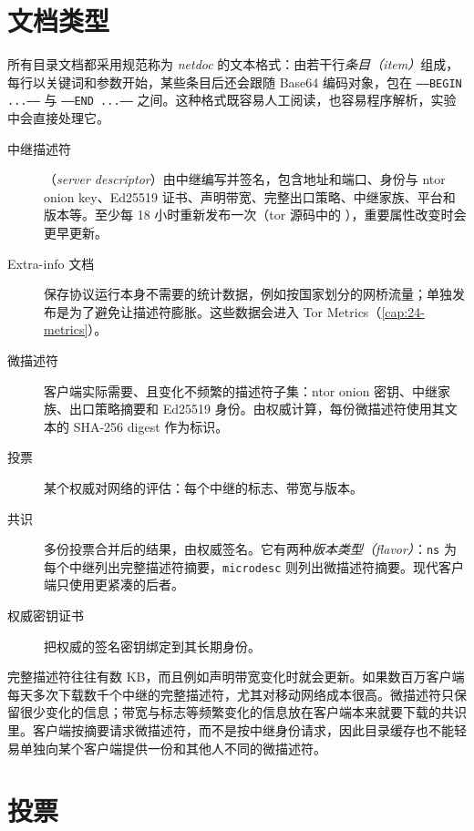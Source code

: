 \section{文档类型}\label{sec:dir-documenti}

所有目录文档都采用规范称为 \emph{netdoc} 的文本格式：由若干行\emph{条目（item）}组成，每行以关键词和参数开始，某些条目后还会跟随 Base64 编码对象，包在 \texttt{-----BEGIN ...-----} 与 \texttt{-----END ...-----} 之间。这种格式既容易人工阅读，也容易程序解析，实验中会直接处理它。

\begin{description}
  \item[中继描述符]（\emph{server descriptor}）由中继编写并签名，包含地址和端口、身份与 ntor onion key、Ed25519 证书、声明带宽、完整出口策略、中继家族、平台和版本等。至少每 18 小时重新发布一次（tor 源码中的 ），重要属性改变时会更早更新。
  \item[Extra-info 文档] 保存协议运行本身不需要的统计数据，例如按国家划分的网桥流量；单独发布是为了避免让描述符膨胀。这些数据会进入 Tor Metrics（\cref{cap:24-metrics}）。
  \item[微描述符] 客户端实际需要、且变化不频繁的描述符子集：ntor onion 密钥、中继家族、出口策略摘要和 Ed25519 身份。由权威计算，每份微描述符使用其文本的 SHA-256 digest 作为标识。
  \item[投票] 某个权威对网络的评估：每个中继的标志、带宽与版本。
  \item[共识] 多份投票合并后的结果，由权威签名。它有两种\emph{版本类型（flavor）}：\texttt{ns} 为每个中继列出完整描述符摘要，\texttt{microdesc} 则列出微描述符摘要。现代客户端只使用更紧凑的后者。
  \item[权威密钥证书] 把权威的签名密钥绑定到其长期身份。
\end{description}

\begin{approfondimento}[为什么使用微描述符？]
完整描述符往往有数 KB，而且例如声明带宽变化时就会更新。如果数百万客户端每天多次下载数千个中继的完整描述符，尤其对移动网络成本很高。微描述符只保留很少变化的信息；带宽与标志等频繁变化的信息放在客户端本来就要下载的共识里。客户端按摘要请求微描述符，而不是按中继身份请求，因此目录缓存也不能轻易单独向某个客户端提供一份和其他人不同的微描述符。
\end{approfondimento}

\section{投票}\label{sec:dir-voto}


